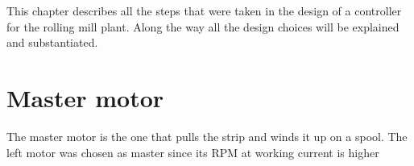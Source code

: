 This chapter describes all the steps that were taken in the design of a controller for the rolling mill plant. Along the way all the design choices will be explained and substantiated.

\section{Master motor}
The master motor is the one that pulls the strip and winds it up on a spool. The left motor was chosen as master since its RPM at working current is higher 